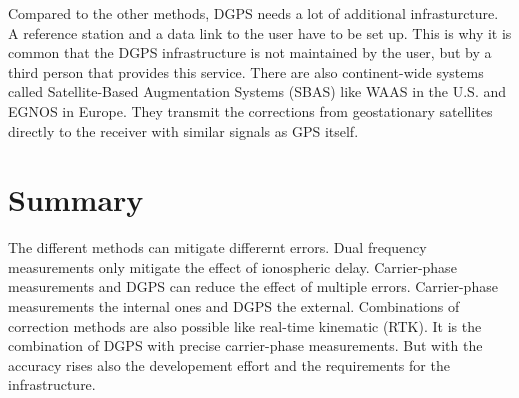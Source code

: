 Compared to the other methods, DGPS needs a lot of additional infrasturcture.
A reference station and a data link to the user have to be set up.
This is why it is common that the DGPS infrastructure is not maintained by the user, but by a third person that provides this service.
There are also continent-wide systems called Satellite-Based Augmentation Systems (SBAS) like WAAS in the U.S. and EGNOS in Europe.
They transmit the corrections from geostationary satellites directly to the receiver with similar signals as GPS itself.

\section{Summary}

The different methods can mitigate differernt errors.
Dual frequency measurements only mitigate the effect of ionospheric delay.
Carrier-phase measurements and DGPS can reduce the effect of multiple errors.
Carrier-phase measurements the internal ones and DGPS the external.
Combinations of correction methods are also possible like real-time kinematic (RTK).
It is the combination of DGPS with precise carrier-phase measurements.
But with the accuracy rises also the developement effort and the requirements for the infrastructure.